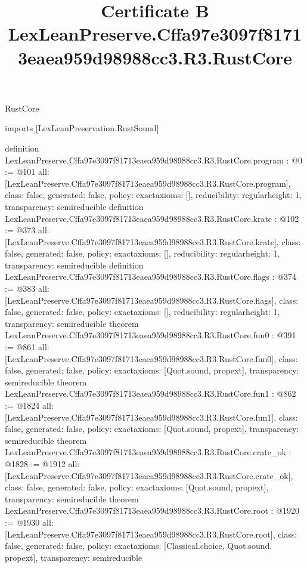 \begin{lexlean}{RustCore}
\title{Certificate B LexLeanPreserve.Cffa97e3097f81713eaea959d98988cc3.R3.RustCore}
\begin{coremodule}
imports [LexLeanPreservation.RustSound]

definition LexLeanPreserve.Cffa97e3097f81713eaea959d98988cc3.R3.RustCore.program : @0 := @101 {
  all: [LexLeanPreserve.Cffa97e3097f81713eaea959d98988cc3.R3.RustCore.program],
  class: false,
  generated: false,
  policy: exact{axioms: []},
  reducibility: regular{height: 1},
  transparency: semireducible
}
definition LexLeanPreserve.Cffa97e3097f81713eaea959d98988cc3.R3.RustCore.krate : @102 := @373 {
  all: [LexLeanPreserve.Cffa97e3097f81713eaea959d98988cc3.R3.RustCore.krate],
  class: false,
  generated: false,
  policy: exact{axioms: []},
  reducibility: regular{height: 1},
  transparency: semireducible
}
definition LexLeanPreserve.Cffa97e3097f81713eaea959d98988cc3.R3.RustCore.flags : @374 := @383 {
  all: [LexLeanPreserve.Cffa97e3097f81713eaea959d98988cc3.R3.RustCore.flags],
  class: false,
  generated: false,
  policy: exact{axioms: []},
  reducibility: regular{height: 1},
  transparency: semireducible
}
theorem LexLeanPreserve.Cffa97e3097f81713eaea959d98988cc3.R3.RustCore.fun0 : @391 := @861 {
  all: [LexLeanPreserve.Cffa97e3097f81713eaea959d98988cc3.R3.RustCore.fun0],
  class: false,
  generated: false,
  policy: exact{axioms: [Quot.sound, propext]},
  transparency: semireducible
}
theorem LexLeanPreserve.Cffa97e3097f81713eaea959d98988cc3.R3.RustCore.fun1 : @862 := @1824 {
  all: [LexLeanPreserve.Cffa97e3097f81713eaea959d98988cc3.R3.RustCore.fun1],
  class: false,
  generated: false,
  policy: exact{axioms: [Quot.sound, propext]},
  transparency: semireducible
}
theorem LexLeanPreserve.Cffa97e3097f81713eaea959d98988cc3.R3.RustCore.crate_ok : @1828 := @1912 {
  all: [LexLeanPreserve.Cffa97e3097f81713eaea959d98988cc3.R3.RustCore.crate_ok],
  class: false,
  generated: false,
  policy: exact{axioms: [Quot.sound, propext]},
  transparency: semireducible
}
theorem LexLeanPreserve.Cffa97e3097f81713eaea959d98988cc3.R3.RustCore.root : @1920 := @1930 {
  all: [LexLeanPreserve.Cffa97e3097f81713eaea959d98988cc3.R3.RustCore.root],
  class: false,
  generated: false,
  policy: exact{axioms: [Classical.choice, Quot.sound, propext]},
  transparency: semireducible
}


\end{coremodule}
\end{lexlean}
